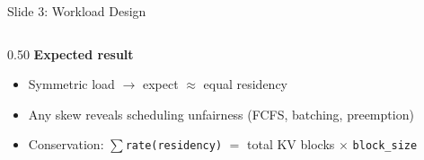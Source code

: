\documentclass[aspectratio=169,11pt]{beamer}
\begin{document}
\begin{frame}{Slide 3: Workload Design}
\begin{columns}[T]
\begin{column}{0.50\textwidth}
\vspace{0.4em}
\textbf{Expected result}

\vspace{0.1em}
{\scriptsize
\begin{itemize}\setlength{\itemsep}{0.1em}
    \item Symmetric load $\to$ expect $\approx$ equal residency
    \item Any skew reveals scheduling unfairness (FCFS, batching, preemption)
    \item Conservation: $\sum$\texttt{rate(residency)} $=$ total KV blocks $\times$ \texttt{block\_size}
\end{itemize}
}

\end{column}
\end{columns}

\end{frame}
\end{document}
